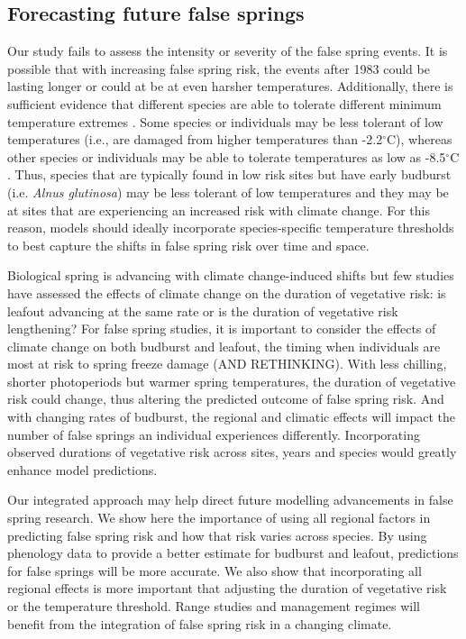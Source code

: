 \documentclass{article}\usepackage[]{graphicx}\usepackage[]{color}
\begin{document}
\subsection*{Forecasting future false springs}
Our study fails to assess the intensity or severity of the false spring events. It is possible that with increasing false spring risk, the events after 1983 could be lasting longer or could at be at even harsher temperatures. Additionally, there is sufficient evidence that different species are able to tolerate different minimum temperature extremes \citep{Korner2016, Lenz2013, Zhuo2018}. Some species or individuals may be less tolerant of low temperatures (i.e., are damaged from higher temperatures than -2.2$^{\circ}$C), whereas other species or individuals may be able to tolerate temperatures as low as -8.5$^{\circ}$C \citep{Lenz2016}. Thus, species that are typically found in low risk sites but have early budburst (i.e. \textit{Alnus glutinosa}) may be less tolerant of low temperatures and they may be at sites that are experiencing an increased risk with climate change. For this reason, models should ideally incorporate species-specific temperature thresholds to best capture the shifts in false spring risk over time and space. 

Biological spring is advancing with climate change-induced shifts but few studies have assessed the effects of climate change on the duration of vegetative risk: is leafout advancing at the same rate or is the duration of vegetative risk lengthening? For false spring studies, it is important to consider the effects of climate change on both budburst and leafout, the timing when individuals are most at risk to spring freeze damage \citep{Lenz2016} (AND RETHINKING). With less chilling, shorter photoperiods but warmer spring temperatures, the duration of vegetative risk could change, thus altering the predicted outcome of false spring risk. And with changing rates of budburst, the regional and climatic effects will impact the number of false springs an individual experiences differently. Incorporating observed durations of vegetative risk across sites, years and species would greatly enhance model predictions. 

Our integrated approach may help direct future modelling advancements in false spring research. We show here the importance of using all regional factors in predicting false spring risk and how that risk varies across species. By using phenology data to provide a better estimate for budburst and leafout, predictions for false springs will be more accurate. We also show that incorporating all regional effects is more important that adjusting the duration of vegetative risk or the temperature threshold. Range studies and management regimes will benefit from the integration of false spring risk in a changing climate. 
  
\end{document}

